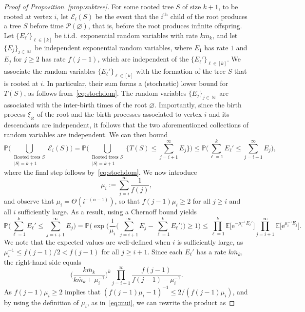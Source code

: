 \documentclass[11pt]{article}
\numberwithin{equation}{section}
\DeclareMathOperator{\N}{\mathbb{N}} %
\renewcommand{\P}{\mathbb{P}} %
\newcommand{\E}{\mathbb{E}} %
\newcommand{\be}{\begin{equation}}
\newcommand{\ee}{\end{equation}}
\newcommand{\e}{\mathrm e}
\def\cE{{\mathcal E}}
\def\cP{{\mathcal P}}
\theoremstyle{definition}
\begin{document}
\begin{proof}[Proof of Proposition~\ref{prop:subtree}]
    For some rooted tree $S$ of size $k+1$, to be rooted at vertex $i$, let $\cE_i(S)$ be the event that the $i^{\text{th}}$ child of the root produces a tree $S$ before time $\cP(\varnothing)$, that is, before the root produces infinite offspring. Let $\{E_\ell'\}_{\ell\in[k]}$ be i.i.d.\ exponential random variables with rate $k\overline m_k$, and let $\{E_j\}_{j\in\N}$ be independent exponential random variables, where $E_1$ has rate $1$ and $E_j$ for $j\geq 2$ has rate $f(j-1)$, which are independent of the $\{E_\ell'\}_{\ell\in[k]}$. We associate the random variables $\{E_\ell'\}_{\ell\in[k]}$ with the formation of the tree $S$ that is rooted at $i$. In particular, their sum forms a (stochastic) lower bound for $T(S)$, as follows from~\eqref{eq:stochdom}. The random variables $\{E_j\}_{j\in\N}$ are associated with the inter-birth times of the root $\varnothing$. Importantly, since the birth process $\xi_\varnothing$ of the root and the birth processes associated to vertex $i$ and its descendants are independent, it follows that the two aforementioned collections of random variables are independent. We can then bound 
    \be 
    \P\bigg(\bigcup_{\substack{\text{Rooted trees $S$}\\|S|=k+1}}\!\!\!\!\!\!\!\!\cE_i(S)\bigg)=\P\bigg(\bigcup_{\substack{\text{Rooted trees $S$}\\|S|=k+1}}\bigg\{T(S)\leq \sum_{j=i+1}^\infty E_j\bigg\}\bigg)\leq \P\bigg(\sum_{\ell=1}^k E_\ell'\leq \sum_{j=i+1}^\infty E_j\bigg),
    \ee 
    where the final step follows by~\eqref{eq:stochdom}. We now introduce
    \be \label{eq:mui}
    \mu_i:=\sum_{j=i}^\infty \frac{1}{f(j)},
    \ee 
    and observe that $\mu_i=\Theta(i^{-(\alpha-1)})$, so that $f(j-1)\mu_i\geq 2$ for all $j\geq i$ and all $i$ sufficiently large. As a result, using a Chernoff bound yields
    \be
     \P\bigg(\sum_{\ell=1}^k E_\ell'\leq \!\!\sum_{j=i+1}^\infty\!\! E_j\bigg)= \P\bigg(\exp\bigg(\frac{1}{\mu_i}\bigg( \sum_{j=i+1}^\infty E_j-\sum_{\ell=1}^k E_\ell'\bigg)\bigg)\geq 1\bigg)\leq \prod_{\ell=1}^k \E\big[\e^{-\mu_i^{-1} E_\ell'}\big]\prod_{j=i+1}^\infty \E\big[\e^{\mu_i^{-1}E_j}\big]. 
    \ee 
    We note that the expected values are well-defined when $i$ is sufficiently large, as $\mu_i^{-1}\leq f(j-1)/2<f(j-1)$ for all $j\geq  i+1$. Since each $E_\ell'$ has a rate $k\overline m_k$,  the right-hand side equals 
    \be \label{eq:mgfexplicit}
    \Big(\frac{k\overline m_k}{k\overline m_k+\mu_i^{-1}}\Big)^k\!\!\! \prod_{j=i+1}^\infty \frac{f(j-1)}{f(j-1)-\mu_i^{-1}}.
    \ee  
    As $f(j-1)\mu_i\geq 2$ implies that $(f(j-1)\mu_i-1)^{-1}\leq 2/(f(j-1)\mu_i)$, and by using the definition of $\mu_i$, as in~\eqref{eq:mui}, we can rewrite the product as

\end{proof}
\end{document}
